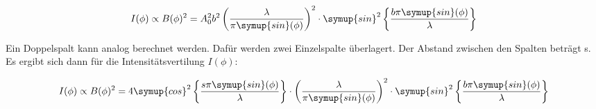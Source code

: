 \begin{equation}
  I(\phi) \propto B(\phi)^2 =
  A_0^2 b^2 \left( \frac{\lambda}{\pi \symup{sin}(\phi)} \right)^2
  \cdot \symup{sin}^2 \left\{ \frac{b \pi \symup{sin}(\phi)}{\lambda} \right\}
  \label{eqn:Einzelspalt}
\end{equation}

Ein Doppelspalt kann analog berechnet werden.
Dafür werden zwei Einzelspalte überlagert.
Der Abstand zwischen den Spalten beträgt s.
Es ergibt sich dann für die Intensitätsvertilung $I(\phi)$:

\begin{equation}
  I(\phi) \propto B(\phi)^2 =
  4 \symup{cos}^2 \left\{ \frac{s \pi \symup{sin}(\phi)}{\lambda} \right\}
  \cdot \left( \frac{\lambda}{\pi \symup{sin}(\phi)} \right)^2
  \cdot \symup{sin}^2 \left\{ \frac{b \pi \symup{sin}(\phi)}{\lambda} \right\}
\end{equation}

